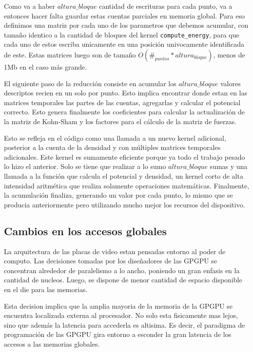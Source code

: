Como va a haber $altura\_{bloque}$ cantidad de escrituras para cada punto, va a entonces
hacer falta guardar estas cuentas parciales en memoria global. Para eso definimos una matriz
por cada uno de los parametros que debemos acumular, con tama\~no identico a la cantidad de bloques
del kernel \texttt{compute\_energy}, para que cada uno de estos escriba unicamente en una posici\'on
univocamente identificada de este. Estas matrices luego son de tama\~no $O(\#_{puntos} * altura_{bloque})$,
menos de 1Mb en el caso m\'as grande.

El siguiente paso de la reducci\'on consiste en acumular los $altura\_{bloque}$ valores descriptos
recien en un solo por punto. Esto implica encontrar donde estan en las matrices temporales las
partes de las cuentas, agregarlas y calcular el potencial correcto. Esto genera finalmente los
coeficientes para calcular la actualizaci\'on de la matriz de Kohn-Sham y los factores para el
c\'alculo de la matriz de fuerzas.

Esto se refleja en el c\'odigo como una llamada a un nuevo kernel adicional, posterior a la
cuenta de la densidad y con m\'ultiples matrices temporales adicionales. Este kernel es sumamente
eficiente porque ya todo el trabajo pesado lo hizo el anterior. Solo se tiene que realizar
a lo sumo $altura\_{bloque}$ sumas y una llamada a la funci\'on que calcula el potencial y densidad,
un kernel corto de alta intensidad aritm\'etica que realiza solamente operaciones matem\'aticas.
Finalmente, la acumulaci\'on finaliza, generando un valor por cada punto, lo mismo que se producia
anteriormente pero utilizando mucho mejor los recursos del dispositivo.

\subsection{Cambios en los accesos globales}
La arquitectura de las placas de video estan pensadas entorno al poder de computo.
Las decisiones tomadas por los diseñadores de las GPGPU se concentran alrededor
de paralelismo a lo ancho, poniendo un gran enfasis en la cantidad de nucleos. Luego,
se dispone de menor cantidad de espacio disponible en el die para las memorias.

Esta decision implica que la amplia mayoria de la memoria de la GPGPU se encuentra
localizada externa al procesador.  No solo esta fisicamente mas lejos, sino que
adem\'as la latencia para accederla es altisima. Es decir, el paradigma de
programaci\'on de las GPGPU gira entorno a esconder la gran latencia de los accesos
a las memorias globales.


